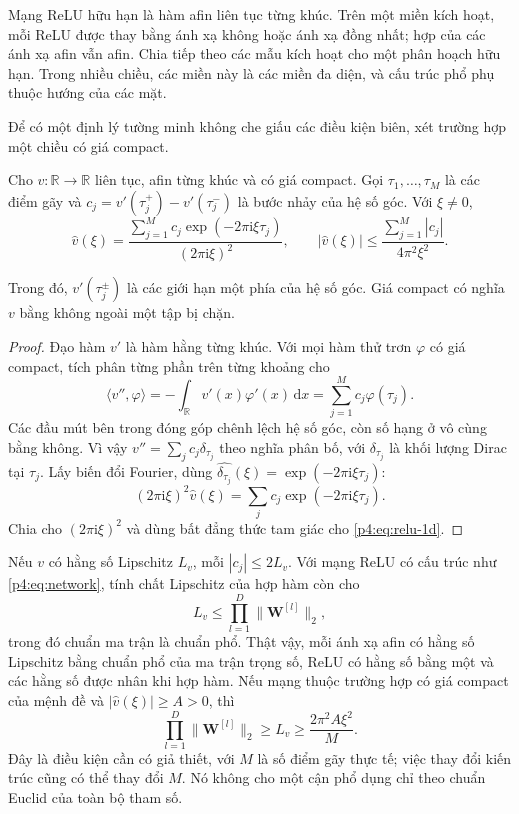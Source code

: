 Mạng ReLU hữu hạn là hàm afin liên tục từng khúc. Trên một miền
kích hoạt, mỗi ReLU được thay bằng ánh xạ không hoặc ánh xạ đồng
nhất; hợp của các ánh xạ afin vẫn afin. Chia tiếp theo các mẫu
kích hoạt cho một phân hoạch hữu hạn. Trong nhiều chiều, các miền
này là các miền đa diện, và cấu trúc phổ phụ thuộc hướng của các mặt.

Để có một định lý tường minh không che giấu các điều kiện biên, xét
trường hợp một chiều có giá compact.

\begin{proposition}
Cho $v:\mathbb{R}\to\mathbb{R}$ liên tục, afin từng khúc và có giá
compact. Gọi $\tau_1,\ldots,\tau_M$ là các điểm gãy và
$c_j=v'(\tau_j^+)-v'(\tau_j^-)$ là bước nhảy của hệ số góc.
Với $\xi\ne0$,
\begin{equation}
 \widehat v(\xi)
 =\frac{\sum_{j=1}^{M}c_j\exp(-2\pi\mathrm{i}\xi\tau_j)}
                         {(2\pi\mathrm{i}\xi)^2},
 \qquad
 |\widehat v(\xi)|\leq
              \frac{\sum_{j=1}^{M}|c_j|}{4\pi^2\xi^2}.
 \label{p4:eq:relu-1d}
\end{equation}
\end{proposition}
Trong đó, $v'(\tau_j^\pm)$ là các giới hạn một phía của hệ số góc.
Giá compact có nghĩa $v$ bằng không ngoài một tập bị chặn.

\begin{proof}
Đạo hàm $v'$ là hàm hằng từng khúc. Với mọi hàm thử trơn
$\varphi$ có giá compact, tích phân từng phần trên từng khoảng cho
\[
 \langle v'',\varphi\rangle
 =-\int_{\mathbb{R}}v'(x)\varphi'(x)\,\mathrm{d}x
 =\sum_{j=1}^{M}c_j\varphi(\tau_j).
\]
Các đầu mút bên trong đóng góp chênh lệch hệ số góc, còn số hạng ở
vô cùng bằng không. Vì vậy $v''=\sum_jc_j\delta_{\tau_j}$ theo nghĩa
phân bố, với $\delta_{\tau_j}$ là khối lượng Dirac tại $\tau_j$.
Lấy biến đổi Fourier, dùng
$\widehat{\delta_{\tau_j}}(\xi)=\exp(-2\pi\mathrm{i}\xi\tau_j)$:
\[
 (2\pi\mathrm{i}\xi)^2\widehat v(\xi)
 =\sum_jc_j\exp(-2\pi\mathrm{i}\xi\tau_j).
\]
Chia cho $(2\pi\mathrm{i}\xi)^2$ và dùng bất đẳng thức tam giác cho
\eqref{p4:eq:relu-1d}.
\end{proof}

Nếu $v$ có hằng số Lipschitz $L_v$, mỗi $|c_j|\leq2L_v$.
Với mạng ReLU có cấu trúc như \eqref{p4:eq:network}, tính chất
Lipschitz của hợp hàm còn cho
\begin{equation}
 L_v\leq\prod_{l=1}^{D}\|\mathbf{W}^{[l]}\|_2,
 \label{p4:eq:lip-network}
\end{equation}
trong đó chuẩn ma trận là chuẩn phổ. Thật vậy, mỗi ánh xạ afin có
hằng số Lipschitz bằng chuẩn phổ của ma trận trọng số, ReLU có hằng
số bằng một và các hằng số được nhân khi hợp hàm.
Nếu mạng thuộc trường hợp có giá compact của mệnh đề và
$|\widehat v(\xi)|\geq A>0$, thì
\begin{equation}
 \prod_{l=1}^{D}\|\mathbf{W}^{[l]}\|_2
 \geq L_v\geq\frac{2\pi^2A\xi^2}{M}.
 \label{p4:eq:spectral-parameter-cost}
\end{equation}
Đây là điều kiện cần có giả thiết, với $M$ là số điểm gãy thực tế;
việc thay đổi kiến trúc cũng có thể thay đổi $M$. Nó không cho một
cận phổ dụng chỉ theo chuẩn Euclid của toàn bộ tham số.

